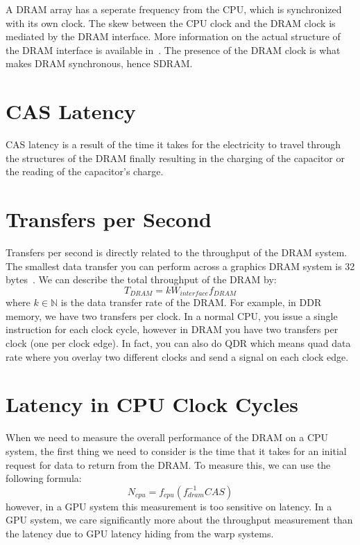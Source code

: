 A DRAM array has a seperate frequency from the CPU, which is synchronized with its own clock. The skew between the CPU clock and the DRAM clock is mediated by the DRAM interface. More information on the actual structure of the DRAM interface is available in~\cite{TODO}. The presence of the DRAM clock is what makes DRAM synchronous, hence SDRAM.

\section{CAS Latency}

CAS latency is a result of the time it takes for the electricity to travel through the structures of the DRAM finally resulting in the charging of the capacitor or the reading of the capacitor's charge.


\section{Transfers per Second}

Transfers per second is directly related to the throughput of the DRAM system. The smallest data transfer you can perform across a graphics DRAM system is 32 bytes~\cite{TODO}. We can describe the total throughput of the DRAM by:
\begin{equation*}
  T_{DRAM}=k W_{interface} f_{DRAM}
\end{equation*}
where $k\in\mathbb{N}$ is the data transfer rate of the DRAM. For example, in DDR memory, we have two transfers per clock. In a normal CPU, you issue a single instruction for each clock cycle, however in DRAM you have two transfers per clock (one per clock edge). In fact, you can also do QDR which means quad data rate where you overlay two different clocks and send a signal on each clock edge.

\section{Latency in CPU Clock Cycles}

When we need to measure the overall performance of the DRAM on a CPU system, the first thing we need to consider is the time that it takes for an initial request for data to return from the DRAM. To measure this, we can use the following formula:
\begin{equation*}
  N_{cpu}=f_{cpu}(f^{-1}_{dram} CAS)
\end{equation*}
however, in a GPU system this measurement is too sensitive on latency. In a GPU system, we care significantly more about the throughput measurement than the latency due to GPU latency hiding from the warp systems.
